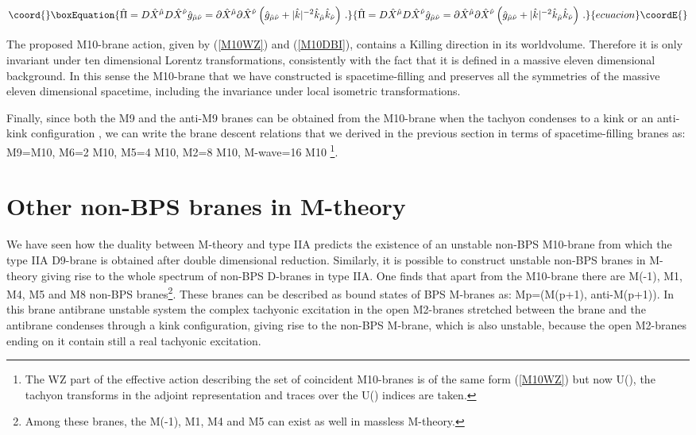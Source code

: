 \documentclass[12pt,a4paper]{article}
\begin{document}
\begin{equation}\coord{}\boxEquation{
{\hat \Pi} = D {\hat X}^{\hat \mu} D {\hat X}^{\hat \nu} 
{\hat g}_{{\hat \mu}{\hat \nu}} = 
\partial {\hat X}^{\hat \mu} \partial {\hat X}^{\hat \nu} 
\left( {\hat g}_{{\hat \mu}{\hat \nu}}
+ |{\hat k}|^{-2}{\hat k}_{\hat \mu}{\hat k}_{\hat \nu} \right) \, .
}{
{\hat \Pi} = D {\hat X}^{\hat \mu} D {\hat X}^{\hat \nu} 
{\hat g}_{{\hat \mu}{\hat \nu}} = 
\partial {\hat X}^{\hat \mu} \partial {\hat X}^{\hat \nu} 
\left( {\hat g}_{{\hat \mu}{\hat \nu}}
+ |{\hat k}|^{-2}{\hat k}_{\hat \mu}{\hat k}_{\hat \nu} \right) \, .
}{ecuacion}\coordE{}\end{equation}

The proposed M10-brane 
action, given by (\ref{M10WZ}) and (\ref{M10DBI}), contains a Killing direction
in its worldvolume. Therefore it is only invariant under ten dimensional
Lorentz transformations, consistently with the fact that it
is defined in a massive eleven dimensional background.
In this sense the M10-brane that we have constructed
is spacetime-filling and preserves all the symmetries of the massive
eleven dimensional spacetime, including the invariance under local
isometric transformations.

Finally, since both the M9 and the anti-M9 branes can be obtained
from the M10-brane when the tachyon condenses to a kink or an
anti-kink configuration \cite{Horava}, we
can write the brane descent relations that we derived in the previous
section in terms of spacetime-filling
branes as: M9=M10, M6=2 M10, M5=4 M10, M2=8 M10, 
M-wave=16 M10 \footnote{The WZ part
of the effective action describing the set of 
\coordHE{} coincident M10-branes
is of the same form (\ref{M10WZ}) but now \coordHE{} U(\coordHE{}), the
tachyon transforms in the adjoint representation \cite{Horava} 
and traces over the U(\coordHE{}) indices are taken.}.


\section{Other non-BPS branes in M-theory}

We have seen how the duality between M-theory and type IIA predicts
the existence of an unstable non-BPS M10-brane from which the type IIA
D9-brane is obtained after double dimensional reduction. Similarly, it
is possible to construct unstable non-BPS branes in M-theory giving
rise to the whole spectrum of non-BPS D-branes in type IIA. One finds
that apart from the M10-brane there are M(-1), M1, M4, M5 and M8
non-BPS branes\footnote{Among these branes, the M(-1), M1, M4 and M5 can 
exist as well in massless M-theory.}. 
These branes can be described as bound states of
BPS M-branes as: Mp=(M(p+1), anti-M(p+1)). In this brane antibrane
unstable system the complex tachyonic excitation in the
open M2-branes stretched between the brane and the antibrane
condenses through a kink configuration, giving rise to the non-BPS
M-brane, which is also unstable, because the open M2-branes ending on 
it contain still a real tachyonic excitation.
\end{document}
